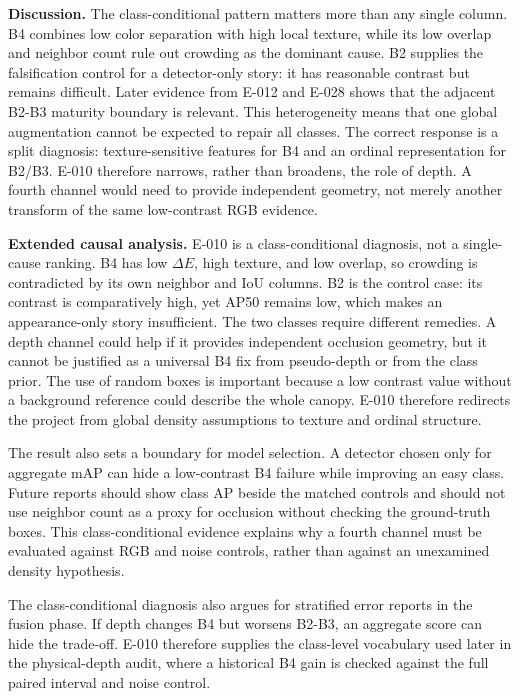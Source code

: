 \documentclass[preprint,12pt]{elsarticle}
\begin{document}
\textbf{Discussion.} The class-conditional pattern matters more than any
single column. B4 combines low color separation with high local texture, while
its low overlap and neighbor count rule out crowding as the dominant cause.
B2 supplies the falsification control for a detector-only story: it has
reasonable contrast but remains difficult. Later evidence from E-012 and E-028
shows that the adjacent B2-B3 maturity boundary is relevant. This heterogeneity means that one global augmentation
cannot be expected to repair all classes. The correct response is a split
diagnosis: texture-sensitive features for B4 and an ordinal representation
for B2/B3. E-010 therefore narrows, rather than broadens, the role of depth.
A fourth channel would need to provide independent geometry, not merely
another transform of the same low-contrast RGB evidence.

\textbf{Extended causal analysis.} E-010 is a class-conditional diagnosis,
not a single-cause ranking. B4 has low \(\Delta E\), high texture, and low
overlap, so crowding is contradicted by its own neighbor and IoU columns. B2
is the control case: its contrast is comparatively high, yet AP50 remains
low, which makes an appearance-only story insufficient. The two classes
require different remedies. A depth channel could help if it provides
independent occlusion geometry, but it cannot be justified as a universal B4
fix from pseudo-depth or from the class prior. The use of random boxes is
important because a low contrast value without a background reference could
describe the whole canopy. E-010 therefore redirects the project from
global density assumptions to texture and ordinal structure.

The result also sets a boundary for model selection. A detector chosen only
for aggregate mAP can hide a low-contrast B4 failure while improving an easy
class. Future reports should show class AP beside the matched controls and
should not use neighbor count as a proxy for occlusion without checking the
ground-truth boxes. This class-conditional evidence explains why a fourth
channel must be evaluated against RGB and noise controls, rather than against
an unexamined density hypothesis.

The class-conditional diagnosis also argues for stratified error reports in
the fusion phase. If depth changes B4 but worsens B2-B3, an aggregate score
can hide the trade-off. E-010 therefore supplies the class-level vocabulary
used later in the physical-depth audit, where a historical B4 gain is checked
against the full paired interval and noise control.
\end{document}
